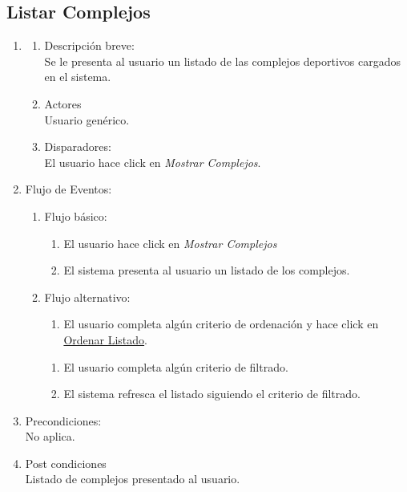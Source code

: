 \documentclass[a4paper,11pt]{article}
\begin{document}
\subsection{Listar Complejos}
\begin{enumerate}

    \item
    \begin{enumerate}
    \item Descripción breve: \\
        Se le presenta al usuario un listado de las complejos deportivos cargados en el sistema.
    \item Actores \\
        Usuario genérico.
    \item Disparadores: \\
        El usuario hace click en \emph{Mostrar Complejos}.
    \end{enumerate}

    \item Flujo de Eventos: 

    \begin{enumerate}

        \item Flujo básico:
        \begin{enumerate}
            \item El usuario hace click en \emph{Mostrar Complejos}
            \item El sistema presenta al usuario un listado de los complejos.
        \end{enumerate}
        \item Flujo alternativo:\\
        \begin{enumerate}
            \item El usuario completa algún criterio de ordenación y
                hace click en \underline{Ordenar Listado}.
        \end{enumerate}
        \begin{enumerate}
            \item El usuario completa algún criterio de filtrado.
            \item El sistema refresca el listado siguiendo el criterio de filtrado.
        \end{enumerate}
    \end{enumerate}

    \item Precondiciones: \\
        No aplica.

    \item Post condiciones \\
        Listado de complejos presentado al usuario.

\end{enumerate}
\end{document}
